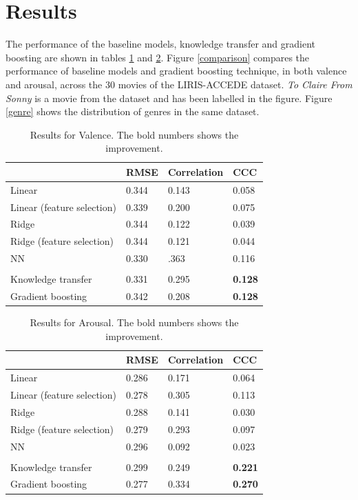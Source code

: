 \documentclass{article}
\begin{document}
\section{Results}
The performance of the baseline models, knowledge transfer and gradient boosting are shown in tables \ref{Valence_table} and \ref{Arousal_table}. Figure \ref{comparison} compares the performance of baseline models and gradient boosting technique, in both valence and arousal, across the 30 movies of the LIRIS-ACCEDE dataset. \textit{To Claire From Sonny} is a movie from the dataset and has been labelled in the figure. Figure \ref{genre} shows the distribution of genres in the same dataset.
\begin{table}[h]
\centering
\begin{tabular}{|l|l|l|l|}
\hline
						& RMSE		& Correlation 	& CCC 	 \\ \hline
Linear 					& 0.344		& 0.143		& 0.058  \\ \hline	
Linear (feature selection)		& 0.339		& 0.200 		& 0.075	 \\ \hline
Ridge					& 0.344 		& 0.122		& 0.039	 \\ \hline
Ridge (feature selection)		& 0.344		& 0.121		& 0.044	 \\ \hline
NN						& 0.330		& .363		& 0.116 \\ \hline
& & & \\ \hline
Knowledge transfer 		& 0.331		& 0.295		& \textbf{0.128}	 \\ \hline
Gradient boosting 			& 0.342 		& 0.208 		& \textbf{0.128}  \\ \hline
\end{tabular}
\caption{Results for Valence. The bold numbers shows the improvement.}
\label{Valence_table}
\end{table}

\begin{table}[h]
\centering
\begin{tabular}{|l|l|l|l|}
\hline
						& RMSE		& Correlation 	& CCC 	 \\ \hline
Linear					& 0.286		& 0.171		& 0.064  \\ \hline	
Linear (feature selection)		& 0.278		& 0.305 		& 0.113	 \\ \hline
Ridge					& 0.288  		& 0.141		& 0.030	 \\ \hline
Ridge (feature selection)		& 0.279		& 0.293		& 0.097	 \\ \hline
NN						& 0.296		& 0.092		& 0.023 \\ \hline
& & & \\ \hline
Knowledge transfer 		& 0.299		& 0.249 		& \textbf{0.221}	 \\ \hline
Gradient boosting 			& 0.277 		& 0.334 		& \textbf{0.270}  \\ \hline
\end{tabular}
\caption{Results for Arousal. The bold numbers shows the improvement.}
\label{Arousal_table}
\end{table}
\end{document}

